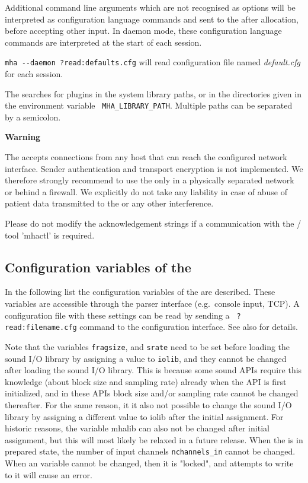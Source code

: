 Additional command line arguments which are not recognised as options
will be interpreted as \mha{} configuration language commands and sent to the
\mhad{} after allocation, before accepting other input.
%
In daemon mode, these \mha{} configuration language commands are interpreted at the 
start of each session.

\verb!mha --daemon ?read:defaults.cfg! will read
configuration file named \emph{default.cfg} for each session.

The \mhad{} searches for \mha{} plugins in the system library paths, or in
the directories given in the environment variable {\tt
MHA\_LIBRARY\_PATH}.
%
Multiple paths can be separated by a semicolon.

\textbf{Warning}

The \mhad{} accepts connections from any host that can reach
the configured network interface.
%
Sender authentication and transport encryption is not implemented.
%
We therefore strongly recommend to use the \mhad{} only in a
physically separated network or behind a firewall.
%
We explicitly do not take any liability in case of abuse of patient
data transmitted to the \mhad{} or any other interference.

Please do not modify the acknowledgement strings if a communication
with the \Octave{}/\Matlab{} tool 'mhactl' is required.

\subsection{Configuration variables of the \mhad{}}

In the following list the configuration variables of the \mhad{} are
described. These variables are accessible through the parser interface
(e.g.\ console input, TCP).
%
A configuration file with these settings can be read by sending a {\tt
?read:filename.cfg} command to the configuration interface. See also
 for details.

Note that the variables \texttt{fragsize}, and \texttt{srate} need to
be set before loading the sound I/O library by assigning a value to
\texttt{iolib}, and they cannot be changed after loading the sound I/O
library. This is because some sound APIs require this knowledge (about
block size and sampling rate) already when the API is first
initialized, and in these APIs block size and/or sampling rate cannot
be changed thereafter.
%
For the same reason, it it also not possible to change the sound I/O
library by assigning a different value to iolib after the initial
assignment.
%
For historic reasons, the variable mhalib can also not be changed
after initial assignment, but this will most likely be relaxed in a
future release.
%
When the \mha{} is in prepared state, the number of input channels
\texttt{nchannels\_in} cannot be changed.
%
When an \mha{} variable cannot be changed, then it is "locked", and
attempts to write to it will cause an error.

